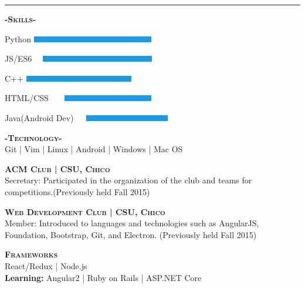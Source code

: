 \documentclass[12pt]{article}
\begin{document}
\noindent\rule{19cm}{0.4pt}
\bigskip
\begin{multicols}{2}
\begin{center}
\textbf{\textsc{-Skills-}}

\begin{small}
\end{small}
\flushleft
Python
\hfill
\includegraphics{C++Skill}\\
\smallskip

JS/ES6
\hfill
\includegraphics{PythonSkill}\\
\smallskip

C++
\hfill
\includegraphics{JSSkill}\\
\smallskip

HTML/CSS
\hfill
\includegraphics{HTMLSkill}\\
\smallskip

Java(Android Dev)
\hfill
\includegraphics{JavaSkill}\\
\smallskip

\center
\textbf{\textsc{-Technology-}}\\
\smallskip
Git | Vim | Linux | Android | Windows | Mac OS

\end{center}

\columnbreak

\center
\footnotesize
\color{black}\textsc{\textbf{ACM Club | CSU, Chico}}\\
\flushleft
\color{Cerulean}Secretary: \color{gray} Participated in the organization of the club and teams for competitions.(Previously held Fall 2015)

\center
\color{black}\textsc{\textbf{Web Development Club | CSU, Chico}}\\
\flushleft
\color{Cerulean}Member: \color{gray}Introduced to languages and technologies such as AngularJS, Foundation, Bootstrap, Git, and Electron. (Previously held Fall 2015)

\center
\color{black}
\textbf{\textsc{Frameworks}}\\
\color{Cerulean}React/Redux | Node.js\color{gray}\\
\textbf{Learning:}
Angular2 | Ruby on Rails | ASP.NET Core

\end{multicols}
\end{document}
